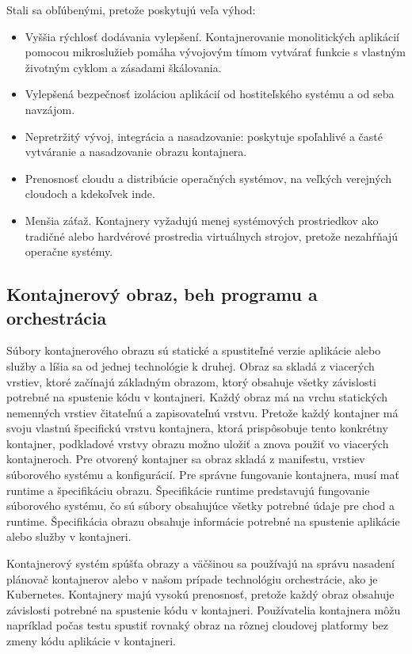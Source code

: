 Stali sa obľúbenými, pretože poskytujú veľa výhod:

\begin{itemize}
    \item Vyššia rýchlosť dodávania vylepšení. Kontajnerovanie monolitických aplikácií pomocou mikroslužieb pomáha vývojovým tímom vytvárať funkcie s vlastným životným cyklom a zásadami škálovania.
	\item Vylepšená bezpečnosť izoláciou aplikácií od hostiteľského systému a od seba navzájom.
	\item Nepretržitý vývoj, integrácia a nasadzovanie: poskytuje spoľahlivé a časté vytváranie a nasadzovanie obrazu kontajnera.
	\item Prenosnosť cloudu a distribúcie operačných systémov, na veľkých verejných cloudoch a kdekoľvek inde.
	\item Menšia záťaž. Kontajnery vyžadujú menej systémových prostriedkov ako tradičné alebo hardvérové prostredia virtuálnych strojov, pretože nezahŕňajú operačne systémy.
\end{itemize}

\subsection{Kontajnerový obraz, beh programu a orchestrácia}

Súbory kontajnerového obrazu sú statické a spustiteľné verzie aplikácie alebo služby a líšia sa od jednej technológie k druhej. Obraz sa skladá z viacerých vrstiev, ktoré začínajú základným obrazom, ktorý obsahuje všetky závislosti potrebné na spustenie kódu v kontajneri. Každý obraz má na vrchu statických nemenných vrstiev čitateľnú a zapisovateľnú vrstvu. Pretože každý kontajner má svoju vlastnú špecifickú vrstvu kontajnera, ktorá prispôsobuje tento konkrétny kontajner, podkladové vrstvy obrazu možno uložiť a znova použiť vo viacerých kontajneroch. Pre otvorený kontajner sa obraz skladá z manifestu, vrstiev súborového systému a konfigurácií. Pre správne fungovanie kontajnera, musí mať runtime a špecifikáciu obrazu. Špecifikácie runtime predstavujú fungovanie súborového systému, čo sú súbory obsahujúce všetky potrebné údaje pre chod a runtime. Špecifikácia obrazu obsahuje informácie potrebné na spustenie aplikácie alebo služby v kontajneri.\cite{orchestrate}

Kontajnerový systém spúšťa obrazy a väčšinou sa používajú na správu nasadení plánovač kontajnerov alebo v našom prípade technológiu orchestrácie, ako je Kubernetes. Kontajnery majú vysokú prenosnosť, pretože každý obraz obsahuje závislosti potrebné na spustenie kódu v kontajneri. Používatelia kontajnera môžu napríklad počas testu spustiť rovnaký obraz na rôznej cloudovej platformy bez zmeny kódu aplikácie v kontajneri.


